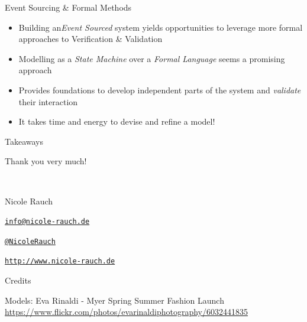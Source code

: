 \begin{frame}[fragile]{Event Sourcing \& Formal Methods}
  \begin{itemize}[<+->]
  \item Building an\emph{Event Sourced} system yields opportunities to leverage more formal approaches to Verification \& Validation
  \item Modelling as a \emph{State Machine} over a \emph{Formal Language} seems a promising approach
  \item Provides foundations to develop independent parts of the system and \emph{validate} their interaction
  \item It takes time and energy to devise and refine a model!
  \end{itemize}
\end{frame}

\begin{frame}[fragile]{Takeaways}
\end{frame}

\begin{frame}{Thank you very much!}

  ~\\[1em]
  \begin{block}{Nicole Rauch}
    \begin{description}[Twitterxx]
    \item[E-Mail]  \href{mailto:info@nicole-rauch.de}{\texttt{info@nicole-rauch.de}}
    \item[Twitter] \href{http://twitter.com/NicoleRauch}{\texttt{@NicoleRauch}}
    \item[Web] \href{http://www.nicole-rauch.de}{\texttt{http://www.nicole-rauch.de}}
    \end{description}
  \end{block}
\end{frame}


\begin{frame}{Credits}

Models: Eva Rinaldi - Myer Spring Summer Fashion Launch \\
{\footnotesize \url{https://www.flickr.com/photos/evarinaldiphotography/6032441835}}


{\footnotesize \url{}}
{\footnotesize \url{}}
{\footnotesize \url{}}

\end{frame}
